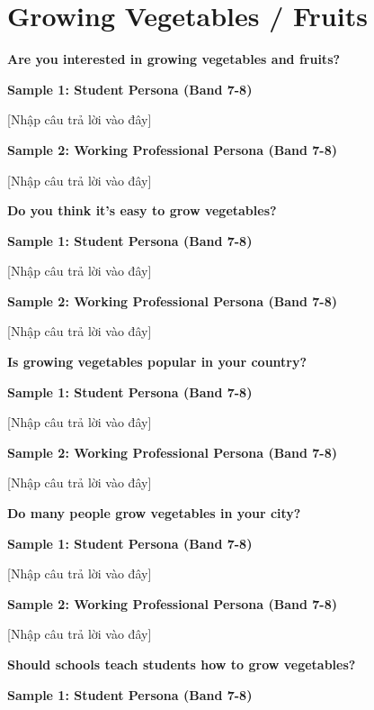 \newpage

\section{Growing Vegetables / Fruits}
\begin{ieltsquestion}
\textbf{Are you interested in growing vegetables and fruits?}
\end{ieltsquestion}
\textbf{Sample 1: Student Persona (Band 7-8)}

[Nhập câu trả lời vào đây]

\textbf{Sample 2: Working Professional Persona (Band 7-8)}

[Nhập câu trả lời vào đây]

\separator

\begin{ieltsquestion}
\textbf{Do you think it's easy to grow vegetables?}
\end{ieltsquestion}
\textbf{Sample 1: Student Persona (Band 7-8)}

[Nhập câu trả lời vào đây]

\textbf{Sample 2: Working Professional Persona (Band 7-8)}

[Nhập câu trả lời vào đây]

\separator

\begin{ieltsquestion}
\textbf{Is growing vegetables popular in your country?}
\end{ieltsquestion}
\textbf{Sample 1: Student Persona (Band 7-8)}

[Nhập câu trả lời vào đây]

\textbf{Sample 2: Working Professional Persona (Band 7-8)}

[Nhập câu trả lời vào đây]

\separator

\begin{ieltsquestion}
\textbf{Do many people grow vegetables in your city?}
\end{ieltsquestion}
\textbf{Sample 1: Student Persona (Band 7-8)}

[Nhập câu trả lời vào đây]

\textbf{Sample 2: Working Professional Persona (Band 7-8)}

[Nhập câu trả lời vào đây]

\separator

\begin{ieltsquestion}
\textbf{Should schools teach students how to grow vegetables?}
\end{ieltsquestion}
\textbf{Sample 1: Student Persona (Band 7-8)}

